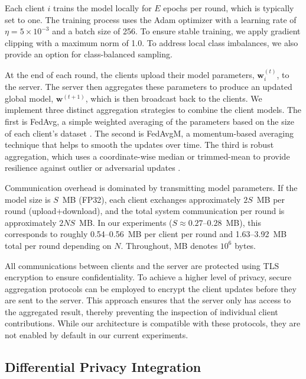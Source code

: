 \documentclass[journal,article,submit,pdftex,moreauthors]{Definitions/mdpi}
\begin{document}
Each client $i$ trains the model locally for $E$ epochs per round, which is typically set to one. The training process uses the Adam optimizer with a learning rate of $\eta = 5 \times 10^{-3}$ and a batch size of 256. To ensure stable training, we apply gradient clipping with a maximum norm of 1.0. To address local class imbalances, we also provide an option for class-balanced sampling.

At the end of each round, the clients upload their model parameters, $\mathbf{w}_i^{(t)}$, to the server. The server then aggregates these parameters to produce an updated global model, $\mathbf{w}^{(t+1)}$, which is then broadcast back to the clients. We implement three distinct aggregation strategies to combine the client models. The first is FedAvg, a simple weighted averaging of the parameters based on the size of each client's dataset \cite{mcmahan2017}. The second is FedAvgM, a momentum-based averaging technique that helps to smooth the updates over time. The third is robust aggregation, which uses a coordinate-wise median or trimmed-mean to provide resilience against outlier or adversarial updates \cite{yin2018byzantine}.

Communication overhead is dominated by transmitting model parameters. If the model size is $S$~MB (FP32), each client exchanges approximately $2S$~MB per round (upload+download), and the total system communication per round is approximately $2NS$~MB. In our experiments ($S\approx0.27$--$0.28$~MB), this corresponds to roughly 0.54--0.56~MB per client per round and 1.63--3.92~MB total per round depending on $N$. Throughout, MB denotes $10^6$ bytes.

All communications between clients and the server are protected using TLS encryption to ensure confidentiality. To achieve a higher level of privacy, secure aggregation protocols can be employed to encrypt the client updates before they are sent to the server. This approach ensures that the server only has access to the aggregated result, thereby preventing the inspection of individual client contributions. While our architecture is compatible with these protocols, they are not enabled by default in our current experiments.

\subsection{Differential Privacy Integration}\label{sec:dp}
\end{document}
